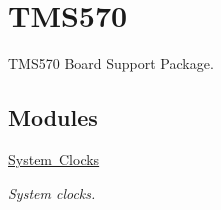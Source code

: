 \hypertarget{group__RTEMSBSPsARMTMS570}{}\section{T\+M\+S570}
\label{group__RTEMSBSPsARMTMS570}


T\+M\+S570 Board Support Package.  


\subsection*{Modules}
\begin{DoxyCompactItemize}
\item 
\mbox{\hyperlink{group__tms570__clock}{System Clocks}}
\begin{DoxyCompactList}\small\item\em System clocks. \end{DoxyCompactList}\end{DoxyCompactItemize}

